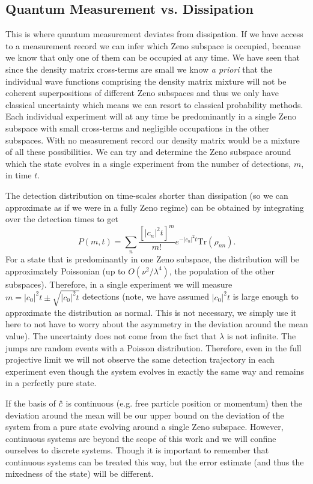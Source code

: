 \subsection{Quantum Measurement vs. Dissipation}

This is where quantum measurement deviates from dissipation. If we
have access to a measurement record we can infer which Zeno subspace
is occupied, because we know that only one of them can be occupied at
any time. We have seen that since the density matrix cross-terms are
small we know \emph{a priori} that the individual wave functions
comprising the density matrix mixture will not be coherent
superpositions of different Zeno subspaces and thus we only have
classical uncertainty which means we can resort to classical
probability methods. Each individual experiment will at any time be
predominantly in a single Zeno subspace with small cross-terms and
negligible occupations in the other subspaces. With no measurement
record our density matrix would be a mixture of all these
possibilities. We can try and determine the Zeno subspace around which
the state evolves in a single experiment from the number of
detections, $m$, in time $t$.

The detection distribution on time-scales shorter than dissipation (so
we can approximate as if we were in a fully Zeno regime) can be
obtained by integrating over the detection times \cite{mekhov2009pra}
to get
\begin{equation}
  P(m,t) = \sum_n \frac{[|c_n|^2 t]^m} {m!} e^{-|c_n|^2 t} \mathrm{Tr} (\rho_{nn}).
\end{equation}
For a state that is predominantly in one Zeno subspace, the
distribution will be approximately Poissonian (up to
$O(\nu^2 / \lambda^4)$, the population of the other
subspaces). Therefore, in a single experiment we will measure
$m = |c_0|^2t \pm \sqrt{|c_0|^2t}$ detections (note, we have assumed
$|c_0|^2 t$ is large enough to approximate the distribution as
normal. This is not necessary, we simply use it here to not have to
worry about the asymmetry in the deviation around the mean value). The
uncertainty does not come from the fact that $\lambda$ is not
infinite. The jumps are random events with a Poisson
distribution. Therefore, even in the full projective limit we will not
observe the same detection trajectory in each experiment even though
the system evolves in exactly the same way and remains in a perfectly
pure state.

If the basis of $\hat{c}$ is continuous (e.g. free particle position or
momentum) then the deviation around the mean will be our upper bound
on the deviation of the system from a pure state evolving around a
single Zeno subspace. However, continuous systems are beyond the scope
of this work and we will confine ourselves to discrete systems. Though
it is important to remember that continuous systems can be treated
this way, but the error estimate (and thus the mixedness of the state)
will be different.

